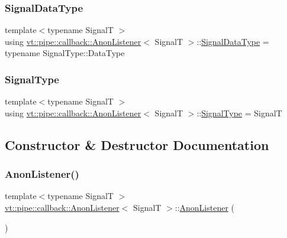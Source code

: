 \subsubsection{\texorpdfstring{Signal\+Data\+Type}{SignalDataType}}
{\footnotesize\ttfamily template$<$typename SignalT $>$ \\
using \hyperlink{structvt_1_1pipe_1_1callback_1_1_anon_listener}{vt\+::pipe\+::callback\+::\+Anon\+Listener}$<$ SignalT $>$\+::\hyperlink{structvt_1_1pipe_1_1callback_1_1_anon_listener_a26182294e0b15bb16dd94040bb47ed73}{Signal\+Data\+Type} =  typename Signal\+Type\+::\+Data\+Type}

\mbox{\label{structvt_1_1pipe_1_1callback_1_1_anon_listener_ac2b8793106d8e11c7e7ee257627ace73}} 
\subsubsection{\texorpdfstring{Signal\+Type}{SignalType}}
{\footnotesize\ttfamily template$<$typename SignalT $>$ \\
using \hyperlink{structvt_1_1pipe_1_1callback_1_1_anon_listener}{vt\+::pipe\+::callback\+::\+Anon\+Listener}$<$ SignalT $>$\+::\hyperlink{structvt_1_1pipe_1_1callback_1_1_anon_listener_ac2b8793106d8e11c7e7ee257627ace73}{Signal\+Type} =  SignalT}



\subsection{Constructor \& Destructor Documentation}
\mbox{\label{structvt_1_1pipe_1_1callback_1_1_anon_listener_ad9ac07733e0f6500aa340c606370eef7}} 
\subsubsection{\texorpdfstring{Anon\+Listener()}{AnonListener()}\hspace{0.1cm}{\footnotesize\ttfamily [1/5]}}
{\footnotesize\ttfamily template$<$typename SignalT $>$ \\
\hyperlink{structvt_1_1pipe_1_1callback_1_1_anon_listener}{vt\+::pipe\+::callback\+::\+Anon\+Listener}$<$ SignalT $>$\+::\hyperlink{structvt_1_1pipe_1_1callback_1_1_anon_listener}{Anon\+Listener} (\begin{DoxyParamCaption}{ }\end{DoxyParamCaption})\hspace{0.3cm}{\ttfamily [default]}}

